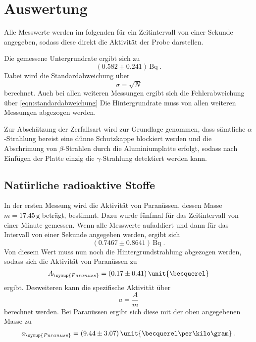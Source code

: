 \section{Auswertung}
\label{sec:Auswertung}

%
Alle Messwerte werden im folgenden für ein Zeitintervall von einer Sekunde angegeben, sodass diese direkt die Aktivität der Probe darstellen.

Die gemessene Untergrundrate ergibt sich zu
\begin{equation*}
    (0.582 \pm 0.241) \,\unit{\becquerel} \; .
\end{equation*}
Dabei wird die Standardabweichung über 
\begin{equation}
    \sigma = \sqrt{N}
    \label{eqn:standardabweichung}
\end{equation}
berechnet. Auch bei allen weiteren Messungen ergibt sich die Fehlerabweichung über \autoref{eqn:standardabweichung}
Die Hintergrundrate muss von allen weiteren Messungen abgezogen werden.

Zur Abschätzung der Zerfallsart wird zur Grundlage genommen, dass sämtliche $\alpha$-Strahlung bereist eine dünne Schutzkappe blockiert werden und die Abschrimung von $\beta$-Strahlen durch
die Aluminiumplatte erfolgt, sodass nach Einfügen der Platte einzig die $\gamma$-Strahlung detektiert werden kann.

\subsection{Natürliche radioaktive Stoffe}
\label{sec:stoffe}
In der ersten Messung wird die Aktivität von Paranüssen, dessen Masse $m = 17.45 \, \unit{\gram}$ beträgt, bestimmt. Dazu wurde fünfmal für das Zeitintervall 
von einer Minute gemessen. Wenn alle Messwerte aufaddiert und dann für das Intervall von einer Sekunde angegeben werden, ergibt sich 
\begin{equation*}
    (0.7467 \pm 0.8641) \, \unit{\becquerel} \; .
\end{equation*}
Von diesem  Wert muss nun noch die Hintergrundstrahlung abgezogen werden, sodass sich die Aktivität von Paranüssen zu 
\begin{equation*}
    A_{\symup{Paranuss}} = (0.17 \pm 0.41) \, \unit{\becquerel} 
\end{equation*}
ergibt. Desweiteren kann die spezifische Aktivität über
\begin{equation}
    a = \frac{A}{m}
    \label{eqn:spezAkt}
\end{equation}
berechnet werden. Bei Paranüssen ergibt sich diese mit der oben angegebenen Masse zu 
\begin{equation*}
    a_{{\symup{Paranuss}}} = (9.44 \pm 3.07) \, \unit{\becquerel \per \kilo\gram} \; .
\end{equation*}

